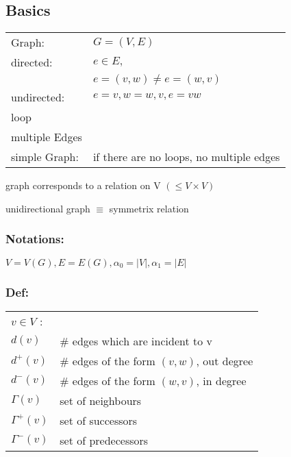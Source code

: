 
\subsection{Basics}

\begin{tabular}{l l}
Graph:& $G = (V,E)$ \\

directed:& $ e \in E,$ \\
	& $ e = (v,w) \neq e=(w,v)$ \\

undirected:& $ e = {v,w} = {w,v}, e = vw$\\

loop \\

multiple Edges \\

simple Graph: & if there are no loops, no multiple edges \\


\end{tabular}

graph corresponds to a relation on V $(\leq V \times V)$

unidirectional graph $\equiv$ symmetrix relation

\subsubsection*{Notations:}
$V = V(G), E = E(G), \alpha_0 = |V|, \alpha_1 = |E|$ 

\subsubsection*{Def:}

\begin{tabular}{l l}
$v \in V$ : \\
$d(v)$		& \# edges which are incident to v \\

$d^+(v)$	& \# edges of the form $(v,w)$, out degree \\
$d^-(v)$	& \# edges of the form $(w,v)$, in degree \\

$\Gamma(v)$ & set of neighbours \\
$\Gamma^+(v)$ & set of successors \\
$\Gamma^-(v)$ & set of predecessors \\

\end{tabular}



